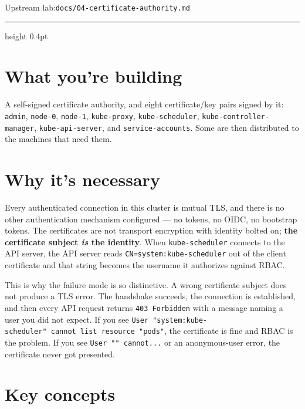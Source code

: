 \documentclass[11pt,oneside]{report}
\newcommand{\upstreamlab}[1]{%
  {\sffamily\footnotesize\color{steel}Upstream lab:\quad\texttt{#1}}\par\vspace{2pt}%
  {\color{rule}\hrule height 0.4pt}\vspace{8pt}}
\begin{document}
\upstreamlab{docs/04-certificate-authority.md}

\hypertarget{what-youre-building-4}{%
\section{What you're
building}\label{what-youre-building-4}}

A self-signed
certificate
authority, and eight
certificate/key
pairs signed by it:
\texttt{admin},
\texttt{node-0},
\texttt{node-1},
\texttt{kube-proxy},
\texttt{kube-scheduler},
\texttt{kube-}\allowbreak{}\texttt{controller-}\allowbreak{}\texttt{manager},
\texttt{kube-api-server},
and
\texttt{service-}\allowbreak{}\texttt{accounts}.
Some are then
distributed to the
machines that need
them.

\hypertarget{why-its-necessary-4}{%
\section{Why it's
necessary}\label{why-its-necessary-4}}

\begin{whybox}

Every authenticated
connection in this
cluster is mutual
TLS, and there is no
other authentication
mechanism configured
--- no tokens, no
OIDC, no bootstrap
tokens. The
certificates are not
transport encryption
with identity bolted
on; \textbf{the
certificate subject
\emph{is} the
identity}. When
\texttt{kube-scheduler}
connects to the API
server, the API
server reads
\texttt{CN=system:}\allowbreak{}\texttt{kube-}\allowbreak{}\texttt{scheduler}
out of the client
certificate and that
string becomes the
username it
authorizes against
RBAC.

\end{whybox}

This is why the
failure mode is so
distinctive. A wrong
certificate subject
does not produce a
TLS error. The
handshake succeeds,
the connection is
established, and
then every API
request returns
\texttt{403\ Forbidden}
with a message
naming a user you
did not expect. If
you see
\texttt{User\ "system:}\allowbreak{}\texttt{kube-}\allowbreak{}\texttt{scheduler"\ cannot\ list\ resource\ "pods"},
the certificate is
fine and RBAC is the
problem. If you see
\texttt{User\ ""\ cannot.}\allowbreak{}\texttt{.}\allowbreak{}\texttt{.}\allowbreak{}
or an anonymous-user
error, the
certificate never
got presented.

\hypertarget{key-concepts-4}{%
\section{Key
concepts}\label{key-concepts-4}}
\end{document}
